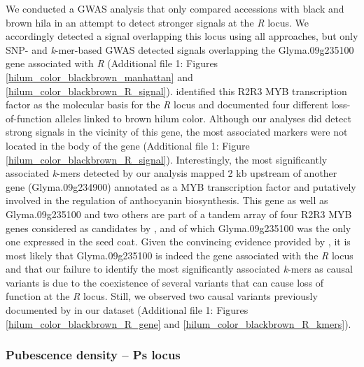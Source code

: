 We conducted a GWAS analysis that only compared accessions with black and brown
hila in an attempt to detect stronger signals at the \textit{R} locus.  We
accordingly detected a signal overlapping this locus using all approaches, but
only SNP- and \textit{k}-mer-based GWAS detected signals overlapping the
Glyma.09g235100 gene associated with \textit{R} (Additional file 1: Figures
\ref{hilum_color_blackbrown_manhattan} and \ref{hilum_color_blackbrown_R_signal}).
\cite{gillman2011} identified this R2R3 MYB transcription factor as the
molecular basis for the \textit{R} locus and documented four different
loss-of-function alleles linked to brown hilum color. Although our analyses did
detect strong signals in the vicinity of this gene, the most associated markers
were not located in the body of the gene (Additional file 1: Figure
\ref{hilum_color_blackbrown_R_signal}).  Interestingly, the most significantly
associated \emph{k}-mers detected by our analysis mapped 2 kb upstream of
another gene (Glyma.09g234900) annotated as a MYB transcription factor and
putatively involved in the regulation of anthocyanin biosynthesis. This gene as
well as Glyma.09g235100 and two others are part of a tandem array of four R2R3
MYB genes considered as candidates by \cite{gillman2011}, and of which
Glyma.09g235100 was the only one expressed in the seed coat. Given the
convincing evidence provided by \cite{gillman2011}, it is most likely that
Glyma.09g235100 is indeed the gene associated with the \emph{R} locus and that
our failure to identify the most significantly associated \emph{k}-mers as
causal variants is due to the coexistence of several variants that can cause
loss of function at the \emph{R} locus.  Still, we observed two causal variants
previously documented by \cite{gillman2011} in our dataset (Additional file 1: Figures
\ref{hilum_color_blackbrown_R_gene} and \ref{hilum_color_blackbrown_R_kmers}). 

\subsubsection*{Pubescence density -- Ps locus}
\label{sv-gwas-main-results-pubescence-density-ps}

